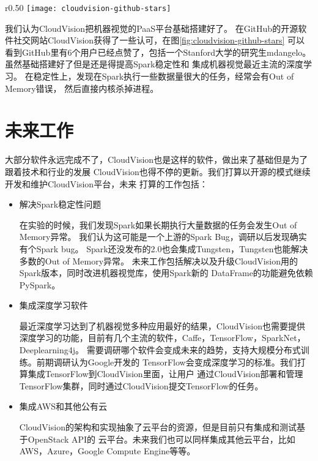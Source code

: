 \begin{wrapfigure}{r}{0.50\textwidth}
  \centering
    \texttt{[image: cloudvision-github-stars]}
    \caption{CloudVision在GitHub获得的认可}
  \label{fig:cloudvision-github-stars}
\end{wrapfigure}
我们认为CloudVision把机器视觉的PaaS平台基础搭建好了。
在GitHub的开源软件社交网站CloudVision获得了一些认可，在图\ref{fig:cloudvision-github-stars}
可以看到GitHub里有6个用户已经点赞了，包括一个Stanford大学的研究生mdangelo。
虽然基础搭建好了但是还是得提高Spark稳定性和
集成机器视觉最近主流的深度学习。
在稳定性上，发现在Spark执行一些数据量很大的任务，经常会有Out of Memory错误，
然后直接内核杀掉进程。


\section{未来工作}
大部分软件永远完成不了，CloudVision也是这样的软件，做出来了基础但是为了跟着技术和行业的发展
CloudVision也得不停的更新。我们打算以开源的模式继续开发和维护CloudVision平台，未来
打算的工作包括：
\begin{itemize}
  \item 解决Spark稳定性问题

        在实验的时候，我们发现Spark如果长期执行大量数据的任务会发生Out of Memory异常。
        我们认为这可能是一个上游的Spark Bug，调研以后发现确实有个Spark bug。\cite{spark-oom-bug}
        Spark还没发布的2.0也会集成Tungsten，Tungsten也能解决多数的Out of Memory异常。
        未来工作包括解决以及升级CloudVision用的Spark版本，同时改进机器视觉库，使用Spark新的
        DataFrame的功能避免依赖PySpark。

  \item 集成深度学习软件

        最近深度学习达到了机器视觉多种应用最好的结果，CloudVision也需要提供
        深度学习的功能，目前有几个主流的软件，Caffe，TensorFlow，SparkNet，Deeplearning4j。
        需要调研哪个软件会变成未来的趋势，支持大规模分布式训练。前期调研认为Google开发的
        TensorFlow会变成深度学习的标准。我们打算集成TensorFlow到CloudVision里面，让用户
        通过CloudVision部署和管理TensorFlow集群，同时通过CloudVision提交TensorFlow的任务。

  \item 集成AWS和其他公有云

        CloudVision的架构和实现抽象了云平台的资源，但是目前只有集成和测试基于OpenStack API的
        云平台。未来我们也可以同样集成其他云平台，比如AWS，Azure，Google Compute Engine等等。

\end{itemize}



